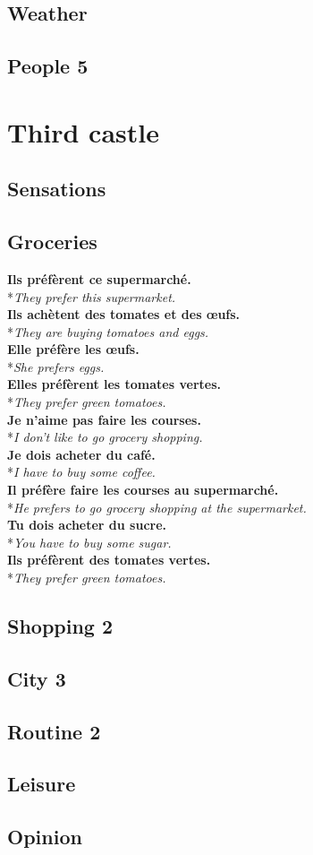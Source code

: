 \documentclass[a4paper,11pt,oneside]{book}
\newcommand{\phrase}[2]{\noindent\textbf{#1}\\*\-\hspace{0.5cm}\textit{#2}\\}
\begin{document}
\section{Weather}
\section{People 5}

\chapter{Third castle}

\section{Sensations}
\section{Groceries}

\phrase{Ils préfèrent ce supermarché.}{They prefer this supermarket.}
\phrase{Ils achètent des tomates et des œufs.}{They are buying tomatoes and eggs.}
\phrase{Elle préfère les œufs.}{She prefers eggs.}
\phrase{Elles préfèrent les tomates vertes.}{They prefer green tomatoes.}
\phrase{Je n'aime pas faire les courses.}{I don't like to go grocery shopping.}
\phrase{Je dois acheter du café.}{I have to buy some coffee.}
\phrase{Il préfère faire les courses au supermarché.}{He prefers to go grocery shopping at the supermarket.}
\phrase{Tu dois acheter du sucre.}{You have to buy some sugar.}
\phrase{Ils préfèrent des tomates vertes.}{They prefer green tomatoes.}




\section{Shopping 2}
\section{City 3}
\section{Routine 2}
\section{Leisure}
\section{Opinion}
\end{document}
